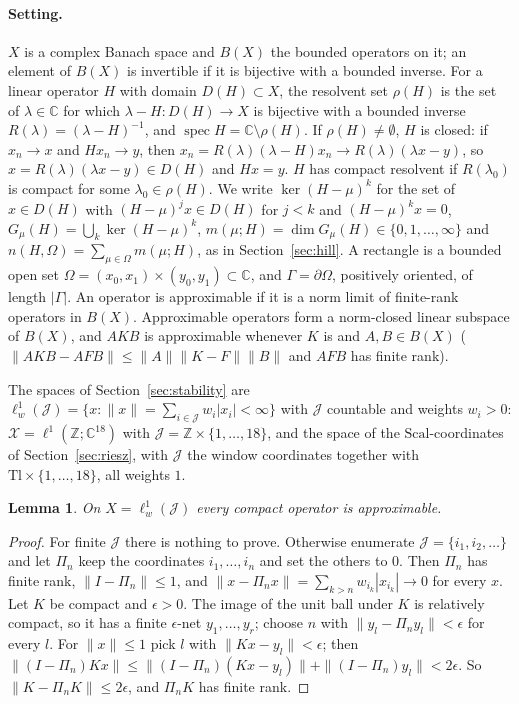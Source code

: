 \documentclass[11pt]{article}
\newtheorem{lemma}{Lemma}[section]
\theoremstyle{definition}
\newcommand{\C}{\mathbb{C}}
\newcommand{\Z}{\mathbb{Z}}
\newcommand{\spec}{\operatorname{spec}}
\newcommand{\Xsp}{\mathcal{X}}
\begin{document}
\paragraph{Setting.} $X$ is a complex Banach space and $B(X)$ the bounded operators on it; an element of $B(X)$ is invertible if it is bijective with a bounded inverse. For a linear operator $H$ with domain $D(H) \subset X$, the resolvent set $\rho(H)$ is the set of $\lambda \in \C$ for which $\lambda - H: D(H) \to X$ is bijective with a bounded inverse $R(\lambda) = (\lambda - H)^{-1}$, and $\spec H = \C\setminus\rho(H)$. If $\rho(H) \ne \emptyset$, $H$ is closed: if $x_n \to x$ and $Hx_n \to y$, then $x_n = R(\lambda)(\lambda - H)x_n \to R(\lambda)(\lambda x - y)$, so $x = R(\lambda)(\lambda x - y) \in D(H)$ and $Hx = y$. $H$ has compact resolvent if $R(\lambda_0)$ is compact for some $\lambda_0 \in \rho(H)$. We write $\ker(H - \mu)^k$ for the set of $x \in D(H)$ with $(H - \mu)^jx \in D(H)$ for $j < k$ and $(H - \mu)^kx = 0$, $G_\mu(H) = \bigcup_k\ker(H - \mu)^k$, $m(\mu; H) = \dim G_\mu(H) \in \{0, 1, \dots, \infty\}$ and $n(H, \Omega) = \sum_{\mu\in\Omega}m(\mu; H)$, as in Section~\ref{sec:hill}. A rectangle is a bounded open set $\Omega = (x_0, x_1) \times (y_0, y_1) \subset \C$, and $\Gamma = \partial\Omega$, positively oriented, of length $|\Gamma|$. An operator is approximable if it is a norm limit of finite-rank operators in $B(X)$. Approximable operators form a norm-closed linear subspace of $B(X)$, and $AKB$ is approximable whenever $K$ is and $A, B \in B(X)$ ($\|AKB - AFB\| \le \|A\|\|K - F\|\|B\|$ and $AFB$ has finite rank).

The spaces of Section~\ref{sec:stability} are $\ell^1_w(\mathcal J) = \{x : \|x\| = \sum_{i\in\mathcal J}w_i|x_i| < \infty\}$ with $\mathcal J$ countable and weights $w_i > 0$: $\Xsp = \ell^1(\Z; \C^{18})$ with $\mathcal J = \Z \times \{1, \dots, 18\}$, and the space of the $\mathrm{Scal}$-coordinates of Section~\ref{sec:riesz}, with $\mathcal J$ the window coordinates together with $\mathrm{Tl}\times\{1, \dots, 18\}$, all weights $1$.

\begin{lemma}\label{lem:A-trunc}
On $X = \ell^1_w(\mathcal J)$ every compact operator is approximable.
\end{lemma}

\begin{proof}
For finite $\mathcal J$ there is nothing to prove. Otherwise enumerate $\mathcal J = \{i_1, i_2, \dots\}$ and let $\Pi_n$ keep the coordinates $i_1, \dots, i_n$ and set the others to $0$. Then $\Pi_n$ has finite rank, $\|I - \Pi_n\| \le 1$, and $\|x - \Pi_nx\| = \sum_{k>n}w_{i_k}|x_{i_k}| \to 0$ for every $x$. Let $K$ be compact and $\epsilon > 0$. The image of the unit ball under $K$ is relatively compact, so it has a finite $\epsilon$-net $y_1, \dots, y_r$; choose $n$ with $\|y_l - \Pi_ny_l\| < \epsilon$ for every $l$. For $\|x\| \le 1$ pick $l$ with $\|Kx - y_l\| < \epsilon$; then $\|(I - \Pi_n)Kx\| \le \|(I - \Pi_n)(Kx - y_l)\| + \|(I - \Pi_n)y_l\| < 2\epsilon$. So $\|K - \Pi_nK\| \le 2\epsilon$, and $\Pi_nK$ has finite rank.
\end{proof}
\end{document}
